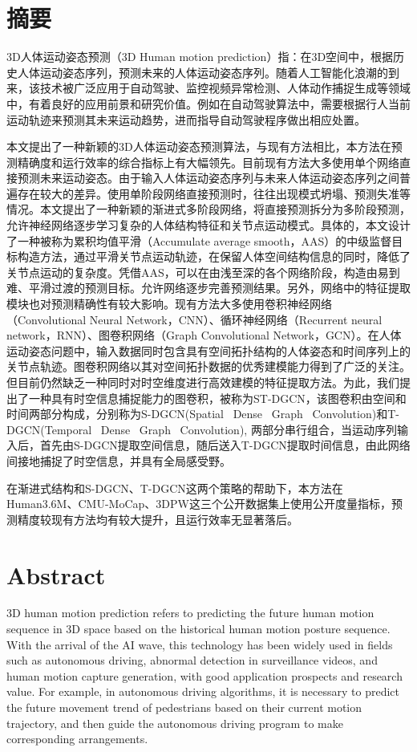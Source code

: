 \chapter{摘\texorpdfstring{\quad}{}要}
	3D人体运动姿态预测（3D Human motion prediction）指：在3D空间中，根据历史人体运动姿态序列，预测未来的人体运动姿态序列。随着人工智能化浪潮的到来，该技术被广泛应用于自动驾驶、监控视频异常检测、人体动作捕捉生成等领域中，有着良好的应用前景和研究价值。例如在自动驾驶算法中，需要根据行人当前运动轨迹来预测其未来运动趋势，进而指导自动驾驶程序做出相应处置。
	
	本文提出了一种新颖的3D人体运动姿态预测算法，与现有方法相比，本方法在预测精确度和运行效率的综合指标上有大幅领先。目前现有方法大多使用单个网络直接预测未来运动姿态。由于输入人体运动姿态序列与未来人体运动姿态序列之间普遍存在较大的差异。使用单阶段网络直接预测时，往往出现模式坍塌、预测失准等情况。本文提出了一种新颖的渐进式多阶段网络，将直接预测拆分为多阶段预测，允许神经网络逐步学习复杂的人体结构特征和关节点运动模式。具体的，本文设计了一种被称为累积均值平滑（Accumulate average smooth，AAS）的中级监督目标构造方法，通过平滑关节点运动轨迹，在保留人体空间结构信息的同时，降低了关节点运动的复杂度。凭借AAS，可以在由浅至深的各个网络阶段，构造由易到难、平滑过渡的预测目标。允许网络逐步完善预测结果。另外，网络中的特征提取模块也对预测精确性有较大影响。现有方法大多使用卷积神经网络（Convolutional Neural Network，CNN）、循环神经网络（Recurrent neural network，RNN）、图卷积网络（Graph Convolutional Network，GCN）。在人体运动姿态问题中，输入数据同时包含具有空间拓扑结构的人体姿态和时间序列上的关节点轨迹。图卷积网络以其对空间拓扑数据的优秀建模能力得到了广泛的关注。但目前仍然缺乏一种同时对时空维度进行高效建模的特征提取方法。为此，我们提出了一种具有时空信息捕捉能力的图卷积，被称为ST-DGCN，该图卷积由空间和时间两部分构成，分别称为S-DGCN(Spatial \ Dense \ Graph \ Convolution)和T-DGCN(Temporal \ Dense \ Graph \ Convolution), 两部分串行组合，当运动序列输入后，首先由S-DGCN提取空间信息，随后送入T-DGCN提取时间信息，由此网络间接地捕捉了时空信息，并具有全局感受野。
		
	在渐进式结构和S-DGCN、T-DGCN这两个策略的帮助下，本方法在Human3.6M、CMU-MoCap、3DPW这三个公开数据集上使用公开度量指标，预测精度较现有方法均有较大提升，且运行效率无显著落后。



\chapter{Abstract}
3D human motion prediction refers to predicting the future human motion sequence in 3D space based on the historical human motion posture sequence. With the arrival of the AI wave, this technology has been widely used in fields such as autonomous driving, abnormal detection in surveillance videos, and human motion capture generation, with good application prospects and research value. For example, in autonomous driving algorithms, it is necessary to predict the future movement trend of pedestrians based on their current motion trajectory, and then guide the autonomous driving program to make corresponding arrangements.


